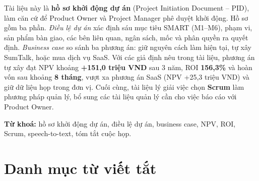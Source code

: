 \documentclass[12pt,a4paper]{report}
\begin{document}
Tài liệu này là \textbf{hồ sơ khởi động dự án} (Project Initiation Document -- PID), làm căn cứ để Product Owner
và Project Manager phê duyệt khởi động. Hồ sơ gồm ba phần. \emph{Điều lệ dự án} xác định sáu mục tiêu SMART (M1--M6),
phạm vi, sản phẩm bàn giao, các bên liên quan, ngân sách, mốc và phân quyền ra quyết định. \emph{Business case}
so sánh ba phương án: giữ nguyên cách làm hiện tại, tự xây SumTalk, hoặc mua dịch vụ SaaS. Với các giả định
nêu trong tài liệu, phương án tự xây đạt NPV khoảng \textbf{+151,0 triệu VND} sau 3 năm, ROI \textbf{156,3\%}
và hoàn vốn sau khoảng \textbf{8 tháng}, vượt xa phương án SaaS (NPV +25,3 triệu VND) và giữ dữ liệu họp
trong đơn vị. Cuối cùng, tài liệu lý giải việc chọn \textbf{Scrum} làm phương pháp quản lý, bổ sung các tài
liệu quản lý cần cho việc báo cáo với Product Owner.

\textbf{Từ khoá:} hồ sơ khởi động dự án, điều lệ dự án, business case, NPV, ROI, Scrum, speech-to-text,
tóm tắt cuộc họp.

\chapter*{Danh mục từ viết tắt}
\end{document}
